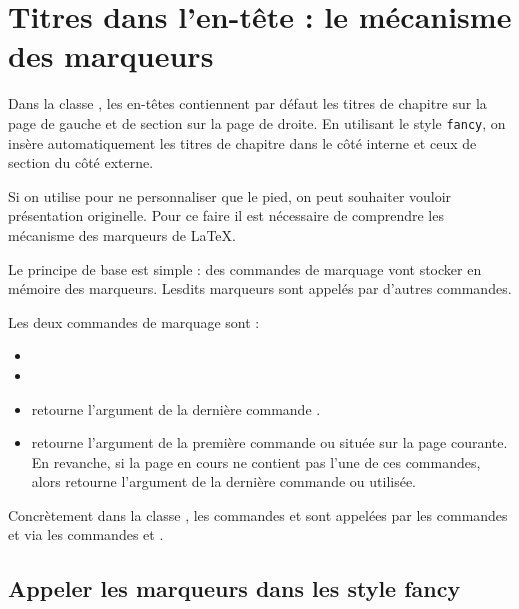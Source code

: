 \section{Titres dans l'en-tête : le mécanisme des marqueurs}

Dans la classe , les en-têtes contiennent par défaut les titres de chapitre sur la page de gauche et de section sur la page de droite. En utilisant le style \verb|fancy|, on insère automatiquement les titres de chapitre dans le côté interne et ceux de section du côté externe. 

Si on utilise  pour ne personnaliser que le pied, on peut souhaiter vouloir présentation  originelle. Pour ce faire il est nécessaire de comprendre les mécanisme des marqueurs de \LaTeX. 

Le principe de base est simple : des commandes de marquage vont stocker en mémoire des marqueurs. Lesdits marqueurs sont appelés par d'autres commandes. 

Les deux commandes de marquage sont :
\begin{itemize}
\item {}
\item {}
\end{itemize}

\begin{itemize}
\item {} retourne l'argument  de la dernière commande .
\item {} retourne l'argument  de la première commande  ou   située sur la page courante. En revanche, si la page en cours ne contient pas l'une de ces commandes, alors  retourne l'argument  de la dernière commande  ou  utilisée.
\end{itemize}

Concrètement dans la classe , les commandes   et  sont appelées par les commandes  et  via les commandes  et . 

\subsection{Appeler les marqueurs dans les style fancy}

